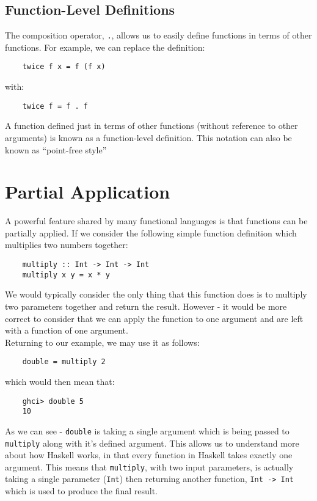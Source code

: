 \subsection{Function-Level Definitions}
The composition operator, \verb|.|, allows us to easily define functions in terms of other functions. For example, we can replace the definition:
\begin{verbatim}
    twice f x = f (f x)
\end{verbatim}
with:
\begin{verbatim}
    twice f = f . f
\end{verbatim}
A function defined just in terms of other functions (without reference to other arguments) is known as a function-level definition. This notation can also be known as ``point-free style''

\section{Partial Application}
A powerful feature shared by many functional languages is that functions can be partially applied. If we consider the following simple function definition which multiplies two numbers together:
\begin{verbatim}
    multiply :: Int -> Int -> Int
    multiply x y = x * y
\end{verbatim}

We would typically consider the only thing that this function does is to multiply two parameters together and return the result. However - it would be more correct to consider that we can apply the function to one argument and are left with a function of one argument. \\

Returning to our example, we may use it as follows:
\begin{verbatim}
    double = multiply 2
\end{verbatim}
which would then mean that:
\begin{verbatim}
    ghci> double 5
    10
\end{verbatim}

As we can see - \verb|double| is taking a single argument which is being passed to \verb|multiply| along with it's defined argument. This allows us to understand more about how Haskell works, in that every function in Haskell takes exactly one argument. This means that \verb|multiply|, with two input parameters, is actually taking a single parameter (\verb|Int|) then returning another function, \verb|Int -> Int| which is used to produce the final result. \\

